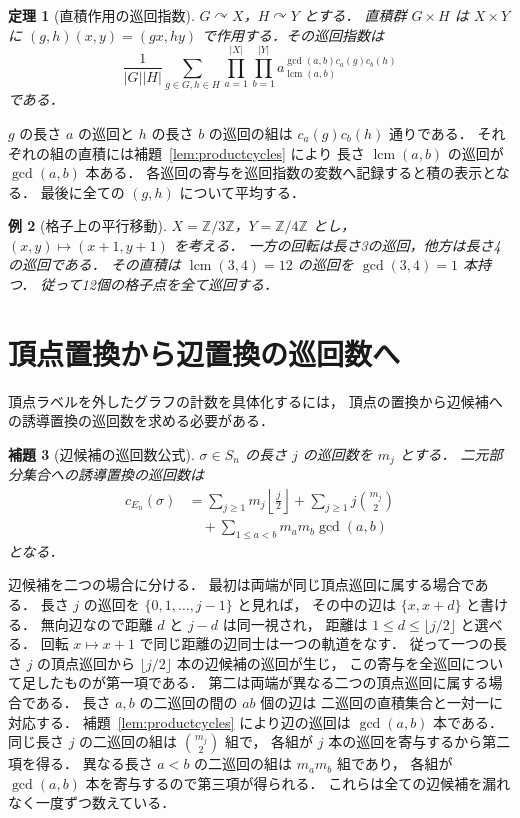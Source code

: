 \documentclass[a5paper,10pt,onecolumn]{jsarticle}
\makeatletter
\theoremstyle{mathnotetheorem}
\newtheorem{theorem}{定理}[section]
\newtheorem{lemma}[theorem]{補題}
\newtheorem{example}[theorem]{例}
\renewcommand{\proofname}{証明}
\renewenvironment{proof}[1][\proofname]{%
  \par\pushQED{\qed}\normalfont\topsep4\p@\@plus2\p@\relax
  \trivlist\item[\hskip\labelsep\bfseries #1]\ignorespaces
}{\popQED\endtrivlist\@endpefalse}
\makeatother
\begin{document}
\begin{theorem}[直積作用の巡回指数]\label{thm:productcycleindex}
$G\curvearrowright X$，$H\curvearrowright Y$ とする．
直積群 $G\times H$ は $X\times Y$ に
$(g,h)(x,y)=(gx,hy)$ で作用する．その巡回指数は
\[
 \frac1{|G||H|}\sum_{g\in G,h\in H}
 \prod_{a=1}^{|X|}\prod_{b=1}^{|Y|}
 a_{\operatorname{lcm}(a,b)}^ {
 \gcd(a,b)c_a(g)c_b(h)}
\]
である．
\end{theorem}
\begin{proof}
$g$ の長さ $a$ の巡回と $h$ の長さ $b$ の巡回の組は
$c_a(g)c_b(h)$ 通りである．
それぞれの組の直積には補題~\ref{lem:productcycles} により
長さ $\operatorname{lcm}(a,b)$ の巡回が
$\gcd(a,b)$ 本ある．
各巡回の寄与を巡回指数の変数へ記録すると積の表示となる．
最後に全ての $(g,h)$ について平均する．
\end{proof}

\begin{example}[格子上の平行移動]
$X=\mathbb Z/3\mathbb Z$，$Y=\mathbb Z/4\mathbb Z$ とし，
$(x,y)\mapsto(x+1,y+1)$ を考える．
一方の回転は長さ3の巡回，他方は長さ4の巡回である．
その直積は $\operatorname{lcm}(3,4)=12$ の巡回を
$\gcd(3,4)=1$ 本持つ．
従って12個の格子点を全て巡回する．
\end{example}

\section{頂点置換から辺置換の巡回数へ}
頂点ラベルを外したグラフの計数を具体化するには，
頂点の置換から辺候補への誘導置換の巡回数を求める必要がある．

\begin{lemma}[辺候補の巡回数公式]\label{lem:edgecycles}
$\sigma\in S_n$ の長さ $j$ の巡回数を $m_j$ とする．
二元部分集合への誘導置換の巡回数は
\begin{equation}\label{eq:edgecycles}
 \begin{aligned}
 c_{E_n}(\sigma)
 &=\sum_{j\ge1}m_j\left\lfloor\frac j2\right\rfloor
 +\sum_{j\ge1}j{m_j\choose2}\\
 &\quad+\sum_{1\le a<b}m_am_b\gcd(a,b)
 \end{aligned}
\end{equation}
となる．
\end{lemma}
\begin{proof}
辺候補を二つの場合に分ける．
最初は両端が同じ頂点巡回に属する場合である．
長さ $j$ の巡回を $\{0,1,\ldots,j-1\}$ と見れば，
その中の辺は $\{x,x+d\}$ と書ける．
無向辺なので距離 $d$ と $j-d$ は同一視され，
距離は $1\le d\le\lfloor j/2\rfloor$ と選べる．
回転 $x\mapsto x+1$ で同じ距離の辺同士は一つの軌道をなす．
従って一つの長さ $j$ の頂点巡回から
$\lfloor j/2\rfloor$ 本の辺候補の巡回が生じ，
この寄与を全巡回について足したものが第一項である．
第二は両端が異なる二つの頂点巡回に属する場合である．
長さ $a,b$ の二巡回の間の $ab$ 個の辺は
二巡回の直積集合と一対一に対応する．
補題~\ref{lem:productcycles} により辺の巡回は $\gcd(a,b)$ 本である．
同じ長さ $j$ の二巡回の組は ${m_j\choose2}$ 組で，
各組が $j$ 本の巡回を寄与するから第二項を得る．
異なる長さ $a<b$ の二巡回の組は $m_am_b$ 組であり，
各組が $\gcd(a,b)$ 本を寄与するので第三項が得られる．
これらは全ての辺候補を漏れなく一度ずつ数えている．
\end{proof}
\end{document}
